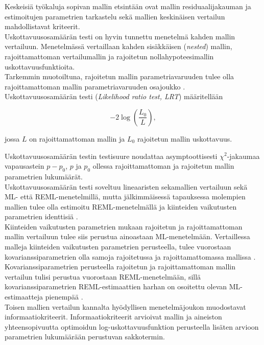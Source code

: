 \documentclass[finnish]{docopts}
\begin{document}
Keskeisiä työkaluja sopivan mallin etsintään ovat mallin residuaalijakauman ja estimoitujen parametrien tarkastelu sekä mallien keskinäisen vertailun mahdollistavat kriteerit.\\

Uskottavuusosamäärän testi on hyvin tunnettu menetelmä kahden mallin vertailuun. Menetelmässä vertaillaan kahden sisäkkäisen (\textit{nested}) mallin, rajoittamattoman vertailumallin ja rajoitetun nollahypoteesimallin uskottavuusfunktioita.\\

Tarkemmin muotoiltuna, rajoitetun mallin parametriavaruuden tulee olla rajoittamattoman mallin parametriavaruuden osajoukko \cite{west14}.\\

Uskottavuusosamäärän testi (\textit{Likelihood ratio test, LRT}) määritellään

$$
-2 \log(\frac{L_0}{L}),
$$

jossa $L$ on rajoittamattoman mallin ja $L_0$ rajoitetun mallin uskottavuus.

Uskottavuusosamäärän testin testisuure noudattaa asymptoottisesti $\chi^2$-jakaumaa vapausastein $p-p_0$, $p$ ja $p_0$ ollessa rajoittamattoman ja rajoitetun mallin parametrien lukumäärät.\\

 Uskottavuusosamäärän testi soveltuu lineaaristen sekamallien vertailuun sekä ML- että REML-menetelmillä, mutta jälkimmäisessä tapauksessa molempien mallien tulee olla estimoitu REML-menetelmällä ja kiinteiden vaikutusten parametrien identtisiä \cite{pinheiro00}.\\
 
 Kiinteiden vaikutusten parametrien mukaan rajoitetun ja rajoittamattoman mallin vertailuun tulee siis perustua ainoastaan ML-menetelmään. Vertaillessa malleja kiinteiden vaikutusten parametrien perusteella, tulee vuorostaan kovarianssiparametrien olla samoja rajoitetussa ja rajoittamattomassa mallissa \cite{west14}.\\
 
 Kovarianssiparametrien perusteella rajoitetun ja rajoittamattoman mallin vertailun tulisi perustua vuorostaan REML-menetelmään, sillä kovarianssiparametrien REML-estimaattien harhan on osoitettu olevan ML-estimaatteja pienempää \cite{west14}.\\
 
 Toisen mallien vertailun kannalta hyödyllisen menetelmäjoukon muodostavat informaatiokriteerit. Informaatiokriteerit arvioivat mallin ja aineiston yhteensopivuutta optimoidun log-uskottavuusfunktion perusteella lisäten arvioon parametrien lukumäärään perustuvan sakkotermin.\\
 
\end{document}
